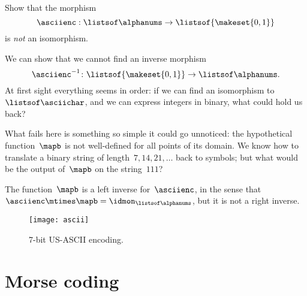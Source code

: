 \begin{exercise}
    Show that the morphism
    \begin{equation}
        \label{eq:ascii-to-bin}
        \asciienc: \listsof\alphanums \to \listsof{\makeset{0,1}}
    \end{equation}
    is \emph{not} an isomorphism.
\end{exercise}
\begin{solution}
    We can show that we cannot find an inverse morphism
    \begin{equation}
        \label{eq:bin-to-ascii}
        \asciienc^{-1}\colon \listsof{\makeset{0,1}} \to \listsof\alphanums.
    \end{equation}
    At first sight everything seems in order: if we can find an isomorphism to~$\listsof\asciichar$, and we can express integers in binary, what could hold us back?

    What fails here is something so simple it could go unnoticed: the hypothetical function~$\mapb$ is not well-defined for all points of its domain.
    We know how to translate a binary string of length~$7,14,21,\ldots$ back to symbols; but what would be the output of~$\mapb$ on the string~$111$?

    The function~$\mapb$ is a left inverse for~$\asciienc$, in the sense that~$\asciienc\mtimes \mapb = \idmon_{\listsof\alphanums}$, but it is not a right inverse.

\end{solution}

\vfill
\begin{figure}[h]
    \texttt{[image: ascii]}
    \caption{7-bit US-ASCII encoding. \label{fig:asciifigure}}
\end{figure}

\section{Morse coding}

